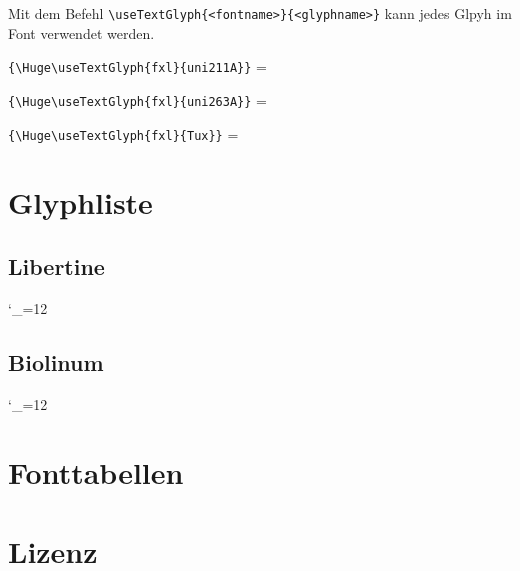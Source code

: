 \documentclass{fontdokuold}
\begin{document}
Mit dem Befehl \verb|\useTextGlyph{<fontname>}{<glyphname>}| kann jedes Glpyh im Font
verwendet werden.


\verb|{\Huge\useTextGlyph{fxl}{uni211A}}| = {\Huge{}} \par
\verb|{\Huge\useTextGlyph{fxl}{uni263A}}| = {\Huge{}} \par
\verb|{\Huge\useTextGlyph{fxl}{Tux}}| = {\Huge{}} \par


\chapter{Glyphliste}

\newcommand{\glyphTabEntry}[2]{%
\ifGylphExists{#1}{#2}{%
{\large\texttt{#2}\hfill\Huge\strut\useTextGlyph{#1}{#2}\par}}{}
}

\section{Libertine}
\setlength{\columnsep}{1cm}
\begin{multicols}{2}
{\catcode`\_=12

}
\end{multicols}

\newpage
\section{Biolinum}
\setlength{\columnsep}{1cm}
\begin{multicols}{2}
{\catcode`\_=12

}
\end{multicols}


\chapter{Fonttabellen}

\newcommand{\printFDFont}[1]{\InputIfFileExists{#1.inc}{}{}}
\let\myfdentry=\PrintTableFontShape%



\chapter{Lizenz}
\end{document}

